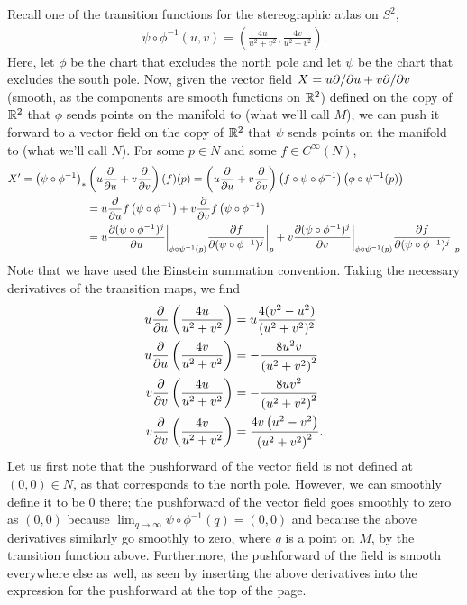 \documentclass{../../mathnotes}
\begin{document}
Recall one of the transition functions for the stereographic atlas on $S^2$,
\begin{align*}
    \psi\circ\phi^{-1}(u,v)=\left( \frac{4u}{u^2+v^2},\frac{4v}{u^2+v^2} \right).
\end{align*}
Here, let $\phi$ be the chart that excludes the north pole and let $\psi$ be the chart that excludes the
south pole.
Now, given the vector field $X=u\partial/\partial u+v\partial/\partial v$ (smooth, as the components are smooth functions on $\mathbb{R}^2$)
defined on the copy of $\mathbb{R}^2$ that $\phi$ sends points on the manifold to (what we'll call $M$), we can push it forward to a 
vector field on the copy of $\mathbb{R}^2$ that $\psi$ sends points on the manifold to (what we'll call $N$). For some $p\in N$ and
some $f\in C^\infty(N)$,
\begin{align*}
    X'=\left( \psi \circ \phi^{-1} \right)_*&\left( u\frac{\partial}{\partial u} + v\frac{\partial}{\partial v} \right)(f)(p)
    =\left(u\frac{\partial}{\partial u}+v\frac{\partial}{\partial v}\right)\left(f\circ \psi \circ \phi^{-1}\right)\left(\phi\circ\psi^{-1}(p)\right)\\
    &=u\frac{\partial}{\partial u}f\left( \psi\circ\phi^{-1} \right)+v\frac{\partial}{\partial v}f\left( \psi \circ \phi^{-1} \right)\\
    &=u\frac{\partial(\psi\circ\phi^{-1})^j}{\partial u}\bigg|_{\phi\circ\psi^{-1}(p)}\frac{\partial f}{\partial(\psi\circ\phi^{-1})^j}\bigg|_p
    +v\frac{\partial(\psi\circ\phi^{-1})^j}{\partial v}\bigg|_{\phi\circ\psi^{-1}(p)}\frac{\partial f}{\partial(\psi\circ\phi^{-1})^j}\bigg|_p
\end{align*}
Note that we have used the Einstein summation convention. Taking the necessary derivatives of the transition
maps, we find
\begin{align*}
    u\frac{\partial}{\partial u}\left( \frac{4u}{u^2+v^2} \right)&=u\frac{4(v^2-u^2)}{(u^2+v^2)^2}\\
    u\frac{\partial}{\partial u}\left( \frac{4v}{u^2+v^2} \right)&=-\frac{8 u^2 v}{\left(u^2+v^2\right)^2}\\
    v\frac{\partial}{\partial v}\left( \frac{4u}{u^2+v^2} \right)&=-\frac{8 u v^2}{\left(u^2+v^2\right)^2}\\
    v\frac{\partial}{\partial v}\left( \frac{4v}{u^2+v^2} \right)&=\frac{4 v \left(u^2-v^2\right)}{\left(u^2+v^2\right)^2}.
\end{align*}
Let us first note that the pushforward of the vector field is not defined at $(0,0)\in N$, as that corresponds
to the north pole. However, we can smoothly define it to be 0 there; the pushforward of the vector field
goes smoothly to zero as $(0,0)$ because $\lim_{q\to\infty}\psi\circ\phi^{-1}(q)=(0,0)$ and because the above
derivatives similarly go smoothly to zero, where $q$ is a point on $M$,
by the transition function above. Furthermore, the pushforward of the field is smooth everywhere else as well,
as seen by inserting the above derivatives into the expression for the pushforward at the top of the page.
\end{document}
